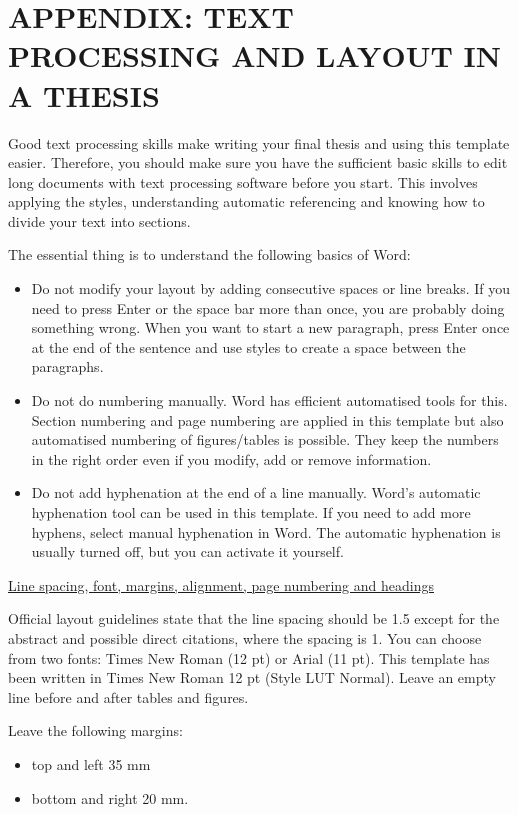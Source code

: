 \chapter{APPENDIX: TEXT PROCESSING AND LAYOUT IN A THESIS}\label{appendix:text_processing_and_layout_in_a_thesis}
Good text processing skills make writing your final thesis and using this template easier. Therefore, you should make sure you have the sufficient basic skills to edit long documents with text processing software before you start. This involves applying the styles, understanding automatic referencing and knowing how to divide your text into sections.

The essential thing is to understand the following basics of Word:
\begin{itemize}[noitemsep]
	\item Do not modify your layout by adding consecutive spaces or line breaks. If you need to press Enter or the space bar more than once, you are probably doing something wrong. When you want to start a new paragraph, press Enter once at the end of the sentence and use styles to create a space between the paragraphs.
	\item Do not do numbering manually. Word has efficient automatised tools for this. Section numbering and page numbering are applied in this template but also automatised numbering of figures/tables is possible. They keep the numbers in the right order even if you modify, add or remove information.
	\item Do not add hyphenation at the end of a line manually. Word’s automatic hyphenation tool can be used in this template. If you need to add more hyphens, select manual hyphenation in Word. The automatic hyphenation is usually turned off, but you can activate it yourself.
\end{itemize}

\underline{Line spacing, font, margins, alignment, page numbering and headings}

Official layout guidelines state that the line spacing should be 1.5 except for the abstract and possible direct citations, where the spacing is 1. You can choose from two fonts: Times New Roman (12 pt) or Arial (11 pt). This template has been written in Times New Roman 12 pt (Style LUT Normal). Leave an empty line before and after tables and figures.

Leave the following margins:
\begin{itemize}[noitemsep]
	\item top and left 35 mm
	\item bottom and right 20 mm. 
\end{itemize}

